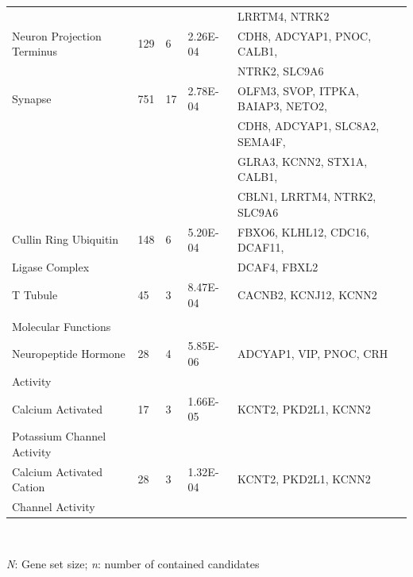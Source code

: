 \begin{refsection}
\begin{table}[H]
\begin{tabular}{@{}lllll@{}}
                           &     &    &            & LRRTM4, NTRK2                      \\
Neuron Projection Terminus & 129 & 6  & 2.26E-04   & CDH8, ADCYAP1, PNOC, CALB1,        \\
                           &     &    &            & NTRK2, SLC9A6                      \\
Synapse                    & 751 & 17 & 2.78E-04   & OLFM3, SVOP, ITPKA, BAIAP3, NETO2, \\
                           &     &    &            & CDH8, ADCYAP1, SLC8A2, SEMA4F,     \\
                           &     &    &            & GLRA3, KCNN2, STX1A, CALB1,        \\
                           &     &    &            & CBLN1, LRRTM4, NTRK2, SLC9A6       \\
Cullin Ring Ubiquitin      & 148 & 6  & 5.20E-04   & FBXO6, KLHL12, CDC16, DCAF11,      \\
Ligase Complex             &     &    &            & DCAF4, FBXL2                       \\
T Tubule                   & 45  & 3  & 8.47E-04   & CACNB2, KCNJ12, KCNN2              \\
                           &     &    &            &                                    \\
Molecular Functions        &     &    &            &                                    \\
Neuropeptide Hormone       & 28  & 4  & 5.85E-06   & ADCYAP1, VIP, PNOC, CRH            \\
Activity                   &     &    &            &                                    \\
Calcium Activated          & 17  & 3  & 1.66E-05   & KCNT2, PKD2L1, KCNN2               \\
Potassium Channel Activity &     &    &            &                                    \\
Calcium Activated Cation   & 28  & 3  & 1.32E-04   & KCNT2, PKD2L1, KCNN2               \\ 
Channel Activity           &     &    &            &                                    \\ \hline
\end{tabular}\\
{\begin{flushleft}
\scriptsize \textit{N}: Gene set size; \textit{n}: number of contained candidates
\end{flushleft}}
\end{table}



\end{refsection}

